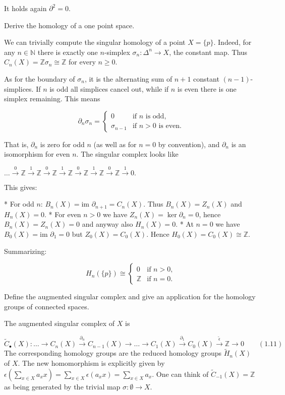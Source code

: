 It holds again \( \partial^2 = 0 \).

Derive the homology of a one point space.

We can trivially compute the singular homology of a point \(X = \{p\}\). Indeed, for any \(n \in \mathbb{N}\) there is exactly one \(n\)-simplex \(\sigma_n: \Delta^n \to X\), the constant map. Thus \(C_n(X) = \mathbb{Z} \sigma_n \cong \mathbb{Z}\) for every \(n \ge 0\). 

As for the boundary of \(\sigma_n\), it is the alternating sum of \(n + 1\) constant \((n-1)\)-simplices. If \(n\) is odd all simplices cancel out, while if \(n\) is even there is one simplex remaining. This means 

\[\partial_n \sigma_n = \begin{cases}
0 & \text{if } n \text{ is odd}, \\
\sigma_{n-1} & \text{if } n > 0 \text{ is even}.
\end{cases}\]

That is, \(\partial_n\) is zero for odd \(n\) (as well as for \(n = 0\) by convention), and \(\partial_n\) is an isomorphism for even \(n\). The singular complex looks like

\(\dots \xrightarrow{0} \mathbb{Z} \xrightarrow{1} \mathbb{Z} \xrightarrow{0} \mathbb{Z} \xrightarrow{1} \mathbb{Z} \xrightarrow{0} \mathbb{Z} \xrightarrow{1} \mathbb{Z} \xrightarrow{0} \mathbb{Z} \xrightarrow{1} 0.\)

This gives:

* For odd \(n\): \(B_n(X) = \text{im } \partial_{n+1} = C_n(X)\). Thus \(B_n(X) = Z_n(X)\) and \(H_n(X) = 0\). 
* For even \(n > 0\) we have \(Z_n(X) = \ker \partial_n = 0\), hence \(B_n(X) = Z_n(X) = 0\) and anyway also \(H_n(X) = 0\).
* At \(n = 0\) we have \(B_0(X) = \text{im } \partial_1 = 0\) but \(Z_0(X) = C_0(X)\). Hence \(H_0(X) = C_0(X) \cong \mathbb{Z}\).

Summarizing:

\[H_n(\{p\}) \cong \begin{cases}
0 & \text{if } n > 0, \\
\mathbb{Z} & \text{if } n = 0.
\end{cases}\]


Define the augmented singular complex and give an application for the homology groups of connected spaces.

The augmented singular complex of \(X\) is

\(\tilde{C}_\bullet(X): \dots \rightarrow C_n(X) \xrightarrow{\partial_n} C_{n-1}(X) \rightarrow \dots \rightarrow C_1(X) \xrightarrow{\partial_1} C_0(X) \xrightarrow{\tilde{\epsilon}} \mathbb{Z} \rightarrow 0 \qquad (1.11)\)
The corresponding homology groups are the reduced homology groups \(\tilde{H}_n(X)\) of \(X\).
The new homomorphism is explicitly given by \( \epsilon(\sum_{x \in X}a_x x) = \sum_{x \in X} \epsilon(a_x x) = \sum_{x \in X} a_x\).
One can think of \( \tilde{C}_{-1}(X) = \mathbb{Z} \) as being generated by the trivial map \( \sigma : \emptyset \to X \).

